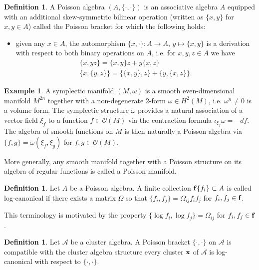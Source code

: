 \documentclass{amsart}
\theoremstyle{definition}
\newtheorem{definition}[theorem]{Definition}
\newtheorem{example}[theorem]{Example}
\theoremstyle{remark}
\numberwithin{equation}{section}
\newcommand{\cA}{{\mathcal{A}}}
\newcommand{\cO}{{\mathcal{O}}}
\newcommand{\bff}{{\bf f}}
\newcommand{\bx}{{\bf x}}
\begin{document}
  \begin{definition}
    A Poisson algebra $(A,\{\cdot,\cdot\})$ is an associative algebra $A$ equipped with an additional skew-symmetric bilinear operation (written as $\{x,y\}$ for $x,y\in A$) called the Poisson bracket for which the following holds:
    \begin{itemize}
      \item given any $x\in A$, the automorphism $\{x,\cdot\}:A\to A$, $y\mapsto\{x,y\}$ is a derivation with respect to both binary operations on $A$, i.e. for $x,y,z\in A$ we have
      \begin{align*}
        \tag{Leibnitz rule} \{x,yz\}=\{x,y\}z+y\{x,z\}\\
        \tag{Jacobi identity}\{x,\{y,z\}\}=\{\{x,y\},z\}+\{y,\{x,z\}\}.
      \end{align*}
    \end{itemize}
  \end{definition}

  \begin{example}
    A symplectic manifold $(M,\omega)$ is a smooth even-dimensional manifold $M^{2n}$ together with a non-degenerate 2-form $\omega\in H^2(M)$, i.e. $\omega^n\ne0$ is a volume form.  The symplectic structure $\omega$ provides a natural association of a vector field $\xi_f$ to a function $f\in\cO(M)$ via the contraction formula $\iota_{\xi_f}\omega=-df$.  The algebra of smooth functions on $M$ is then naturally a Poisson algebra via $\{f,g\}=\omega(\xi_f,\xi_g)$ for $f,g\in\cO(M)$.
  \end{example}
  More generally, any smooth manifold together with a Poisson structure on its algebra of regular functions is called a Poisson manifold.

  \begin{definition}
    Let $A$ be a Poisson algebra.  A finite collection $\bff\{f_i\}\subset A$ is called log-canonical if there exists a matrix $\Omega$ so that $\{f_i,f_j\}=\Omega_{ij}f_if_j$ for $f_i,f_j\in\bff$.
  \end{definition}
  This terminology is motivated by the property $\{\log f_i,\log f_j\}=\Omega_{ij}$ for $f_i,f_j\in\bff$.

  \begin{definition}
    Let $\cA$ be a cluster algebra.  A Poisson bracket $\{\cdot,\cdot\}$ on $\cA$ is compatible with the cluster algebra structure every cluster $\bx$ of $\cA$ is log-canonical with respect to $\{\cdot,\cdot\}$.
  \end{definition}
\end{document}
